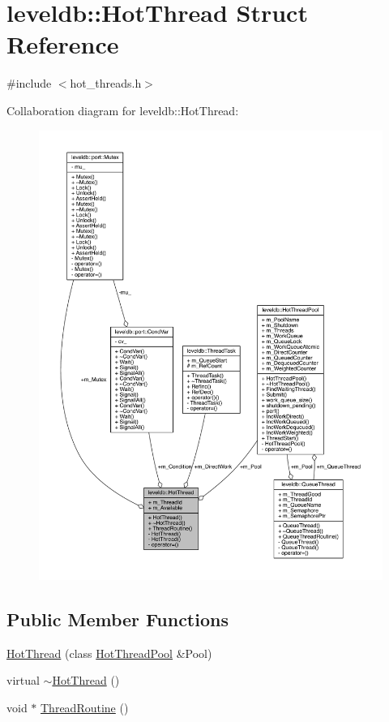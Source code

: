 \hypertarget{structleveldb_1_1_hot_thread}{}\section{leveldb\+:\+:Hot\+Thread Struct Reference}
\label{structleveldb_1_1_hot_thread}


{\ttfamily \#include $<$hot\+\_\+threads.\+h$>$}



Collaboration diagram for leveldb\+:\+:Hot\+Thread\+:\nopagebreak
\begin{figure}[H]
\begin{center}
\leavevmode
\includegraphics[width=350pt]{structleveldb_1_1_hot_thread__coll__graph}
\end{center}
\end{figure}
\subsection*{Public Member Functions}
\begin{DoxyCompactItemize}
\item 
\hyperlink{structleveldb_1_1_hot_thread_a484540b41eda32cfd16aa42778e0254a}{Hot\+Thread} (class \hyperlink{classleveldb_1_1_hot_thread_pool}{Hot\+Thread\+Pool} \&Pool)
\item 
virtual \hyperlink{structleveldb_1_1_hot_thread_a43bf8c26c255410e21c5c015699e67d9}{$\sim$\+Hot\+Thread} ()
\item 
void $\ast$ \hyperlink{structleveldb_1_1_hot_thread_a7c436b64fe276361ead18ec4242e5001}{Thread\+Routine} ()
\end{DoxyCompactItemize}
